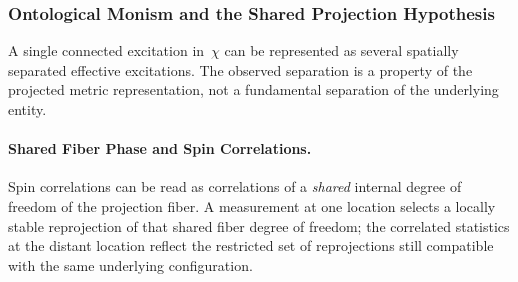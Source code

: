   \subsubsection*{Ontological Monism and the Shared Projection Hypothesis}
    \label{subsec:ontological-monism-shared-projection}

    A single connected excitation in~$\chi$ can be represented as several
    spatially separated effective excitations.
    The observed separation is a property of the projected metric
    representation, not a fundamental separation of the underlying entity.

    \paragraph{Shared Fiber Phase and Spin Correlations.}
      \label{subsec:shared-fiber-phase-spin}
      Spin correlations can be read as correlations of a \emph{shared}
      internal degree of freedom of the projection fiber.
      A measurement at one location selects a locally stable reprojection of
      that shared fiber degree of freedom; the correlated statistics at the
      distant location reflect the restricted set of reprojections still
      compatible with the same underlying configuration.

